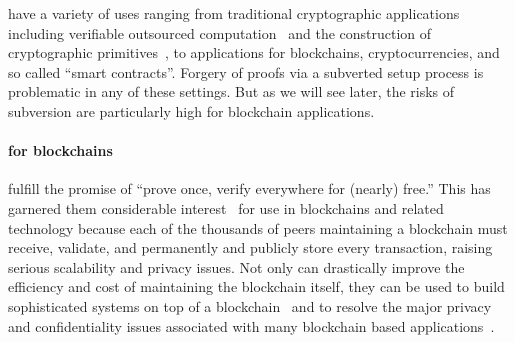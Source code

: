 \documentclass{article}
\begin{document}
{\snarks} have a variety of uses ranging from traditional cryptographic applications  including verifiable outsourced computation~\cite{ParnoGHR13} and the construction of cryptographic primitives~\cite{cryptoeprint:2013:229}, to applications for blockchains, cryptocurrencies, and so called ``smart contracts''. Forgery of proofs via a subverted setup process is problematic  in any of these  settings. But as we will see later, the risks of subversion are particularly high for blockchain applications.

\paragraph*{{\snarks} for blockchains}
{\snarks} fulfill the promise of ``prove once, verify everywhere for (nearly) free.'' This has garnered them considerable interest~\cite{Zcash,ethereumsnarks,kosba2016hawk,bishop2015review,ethplasma} for use in blockchains and related technology because each of the thousands of peers  maintaining a blockchain must receive, validate, and permanently and publicly  store every transaction, raising serious scalability and privacy issues.   Not only can {\snarks} drastically improve the efficiency and cost of maintaining the blockchain itself\cite{ethplasma,bishop2015review}, they can be used to build sophisticated systems on top of a blockchain~\cite{kosba2016hawk,DAM,filecoin} and to resolve the major privacy and confidentiality issues associated with many blockchain based applications~\cite{kosba2016hawk,Zcash,DAM}.


\end{document}

